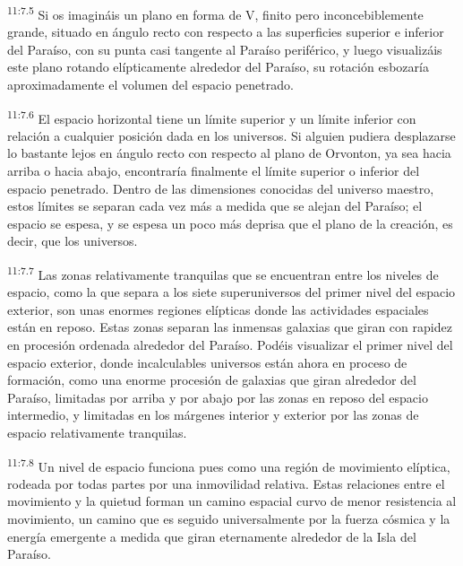 \par
\textsuperscript{11:7.5} Si os imagináis un plano en forma de V, finito pero inconcebiblemente grande, situado en ángulo recto con respecto a las superficies superior e inferior del Paraíso, con su punta casi tangente al Paraíso periférico, y luego visualizáis este plano rotando elípticamente alrededor del Paraíso, su rotación esbozaría aproximadamente el volumen del espacio penetrado.

\par
\textsuperscript{11:7.6} El espacio horizontal tiene un límite superior y un límite inferior con relación a cualquier posición dada en los universos. Si alguien pudiera desplazarse lo bastante lejos en ángulo recto con respecto al plano de Orvonton, ya sea hacia arriba o hacia abajo, encontraría finalmente el límite superior o inferior del espacio penetrado. Dentro de las dimensiones conocidas del universo maestro, estos límites se separan cada vez más a medida que se alejan del Paraíso; el espacio se espesa, y se espesa un poco más deprisa que el plano de la creación, es decir, que los universos.

\par
\textsuperscript{11:7.7} Las zonas relativamente tranquilas que se encuentran entre los niveles de espacio, como la que separa a los siete superuniversos del primer nivel del espacio exterior, son unas enormes regiones elípticas donde las actividades espaciales están en reposo. Estas zonas separan las inmensas galaxias que giran con rapidez en procesión ordenada alrededor del Paraíso. Podéis visualizar el primer nivel del espacio exterior, donde incalculables universos están ahora en proceso de formación, como una enorme procesión de galaxias que giran alrededor del Paraíso, limitadas por arriba y por abajo por las zonas en reposo del espacio intermedio, y limitadas en los márgenes interior y exterior por las zonas de espacio relativamente tranquilas.

\par
\textsuperscript{11:7.8} Un nivel de espacio funciona pues como una región de movimiento elíptica, rodeada por todas partes por una inmovilidad relativa. Estas relaciones entre el movimiento y la quietud forman un camino espacial curvo de menor resistencia al movimiento, un camino que es seguido universalmente por la fuerza cósmica y la energía emergente a medida que giran eternamente alrededor de la Isla del Paraíso.

